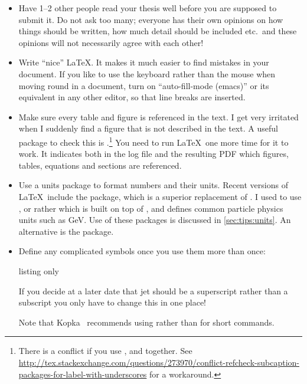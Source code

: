 \begin{itemize}
\item Have 1--2 other people read your thesis well before you are
  supposed to submit it. Do not ask too many; everyone has their own
  opinions on how things should be written, how much detail should be
  included etc.\ and these opinions will not necessarily agree with
  each other!

\item Write \enquote{nice} \LaTeX. It makes it much easier to find mistakes
  in your document. If you like to use the keyboard rather than the
  mouse when moving round in a document, turn on \enquote{auto-fill-mode
  (emacs)} or its equivalent in any other editor, so
  that line breaks are inserted.

\item Make sure every table and figure is referenced in the text. I
  get very irritated when I suddenly find a figure that is not
  described in the text. A useful package to check this is
  .\footnote{%
  There is a conflict if you use ,  and  together.
  See \url{http://tex.stackexchange.com/questions/273970/conflict-refcheck-subcaption-packages-for-label-with-underscores} for a workaround.}
  You need to run \LaTeX\ one more time for it to
  work. It indicates both in the log file and the resulting PDF which
  figures, tables, equations and sections are referenced.

\item Use a units package to format numbers and their units. Recent
  versions of \LaTeX\ include the  package, which
  is a superior replacement of . I used to
  use , or rather  which is
  built on top of , and defines common particle
  physics units such as \si{\GeV}. Use of these packages is
  discussed in \cref{sec:tips:units}.
  An alternative is the  package.

\item Define any complicated symbols once you use them more than
  once:
\begin{tcblisting}{listing only}
\newcommand*{\etajet}{\ensuremath{\eta_{\text{jet}}}\xspace}
\end{tcblisting}
  If you decide at a later date that jet should be a superscript
  rather than a subscript you only have to change this in one place!

  Note that Kopka~\cite{kopka04}
  recommends using  rather than 
  for short commands.


\end{itemize}
